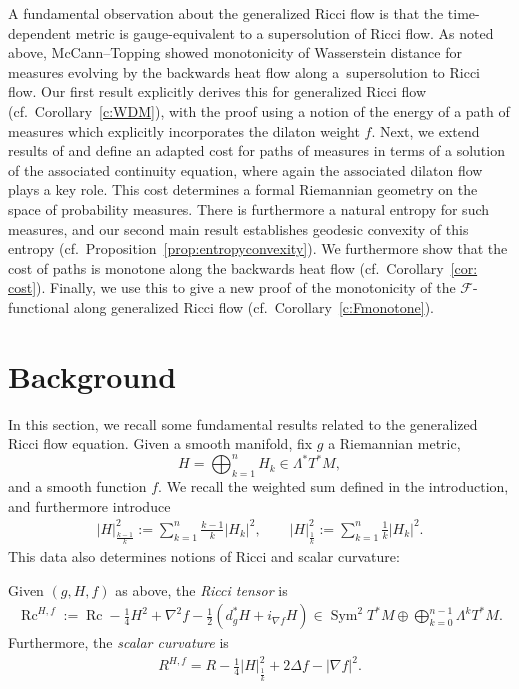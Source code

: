 \documentclass[pdftex]{sigma}
\numberwithin{equation}{section}
\newcommand{\brs}[1]{\left| #1 \right|}
\newcommand{\gD}{\Delta}
\newcommand{\N}{\nabla}
\newcommand{\FF}{\mathcal F}
\newcommand{\wnorm}[1]{\left|#1\right|^2_{\frac1k}}
\newcommand{\wwnorm}[1]{\left|#1\right|^2_{\frac{k-1}k}}
\DeclareMathOperator{\Sym}{Sym}
\DeclareMathOperator{\Rc}{Rc}
\begin{document}
A fundamental observation about the generalized Ricci flow is that the time-dependent metric is gauge-equivalent to a supersolution of Ricci flow. As noted above, McCann--Topping showed monotonicity of Wasserstein distance for measures evolving by the backwards heat flow along a~supersolution to Ricci flow. Our first result explicitly derives this for generalized Ricci flow (cf.~Corollary~\ref{c:WDM}), with the proof using a notion of the energy of a path of measures which explicitly incorporates the dilaton weight $f$. Next, we extend results of \cite{LottOTPRV,ToppingOT} and define an adapted cost for paths of measures in terms of a solution of the associated continuity equation, where again the associated dilaton flow plays a key role. This cost determines a formal Riemannian geometry on the space of probability measures. There is furthermore a natural entropy for such measures, and our second main result establishes geodesic convexity of this entropy (cf.~Proposition~\ref{prop:entropyconvexity}). We furthermore show that the cost of paths is monotone along the backwards heat flow (cf.~Corollary~\ref{cor: cost}). Finally, we use this to give a new proof of the monotonicity of the $\FF$-functional along generalized Ricci flow (cf.\ Corollary~\ref{c:Fmonotone}).

\section{Background}

In this section, we recall some fundamental results related to the generalized Ricci flow equation. Given a smooth manifold, fix $g$ a Riemannian metric, \[H = \bigoplus_{k=1}^n H_k \in \Lambda^* T^* M,\] and a smooth function $f$. We recall the weighted sum defined in the introduction, and furthermore introduce
\begin{align*}
 \wwnorm{H}:= \sum_{k=1}^n\frac{k-1}k|H_k|^2, \qquad \wnorm{H} := \sum_{k=1}^n \frac{1}{k} \brs{H_k}^2.
\end{align*}
This data also determines notions of Ricci and scalar curvature:
\begin{defn} Given $(g, H, f)$ as above, the \emph{Ricci tensor} is
\begin{align*}
 \Rc^{H,f} := \Rc - \frac{1}{4} H^2 + \N^2 f - \frac{1}{2} \left( d^*_g H + i_{\N f} H \right) \in \Sym^2 T^* M \oplus \bigoplus_{k=0}^{n-1} \Lambda^k T^* M.
\end{align*}
Furthermore, the \emph{scalar curvature} is
\begin{align*}
 R^{H,f} = R - \frac{1}{4} \wnorm{H} + 2 \gD f - \brs{\N f}^2.
\end{align*}
\end{defn}
\end{document}
